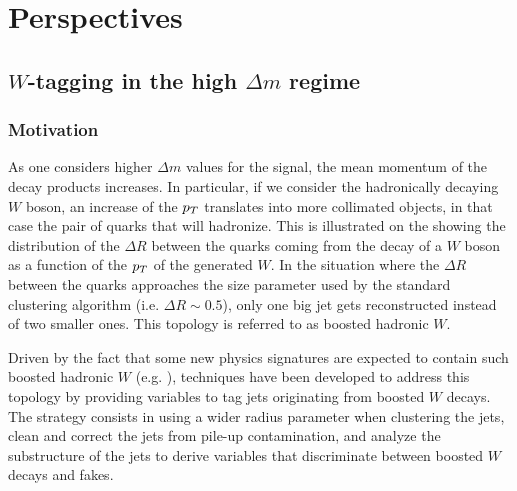     \section{Perspectives \label{sec:analysis_perspective}}

    \subsection{$W$-tagging in the high $\Delta m$ regime}

    \subsubsection{Motivation}

     As one considers higher $\Delta m$ values for the signal, the mean momentum of
     the decay products increases. In particular, if we consider the hadronically
     decaying $W$ boson, an increase of the $p_T$ translates into more collimated objects,
     in that case the pair of quarks that will hadronize. This is illustrated on
     the  showing the
     distribution of the $\Delta R$ between the
     quarks coming from the decay of a $W$ boson as a function of the $p_T$ of
     the generated
     $W$. In the situation where the $\Delta R$ between the quarks approaches the
     size parameter used by the standard clustering algorithm (i.e. $\Delta R
     \sim 0.5$), only one big jet gets reconstructed instead of two smaller ones.
     This topology is referred to as boosted hadronic $W$.


     Driven by the fact that some new physics signatures are expected to contain
     such boosted hadronic $W$ (e.g. \cite{SUS-12-024}), techniques have been developed to
     address this topology by providing variables to tag jets originating from
     boosted $W$ decays. The strategy consists in using a wider radius parameter
     when clustering the jets, clean and correct the jets from pile-up contamination,
     and analyze the substructure of the jets to derive variables that discriminate
     between boosted $W$ decays and fakes.


